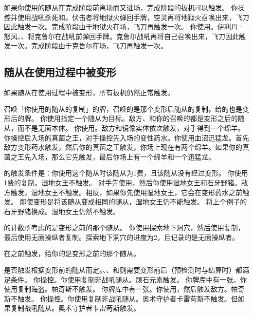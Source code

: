 如果你使用的随从在完成阶段前离场而又进场，完成阶段的扳机可以触发。
\example 你操控并使用战吼杀死和。伏击者将地狱火弹回手牌，空灵再将地狱火召唤出来，飞刀因此触发一次。完成阶段由于地狱火在场，飞刀再触发一次。
\example 你使用。伊利丹·怒风、、将克鲁尔在战吼前弹回手牌。克鲁尔战吼再将自己召唤出来，飞刀因此触发一次。完成阶段由于克鲁尔在场，飞刀再触发一次。

\subsection{随从在使用过程中被变形}

如果随从在使用过程中被变形，所有扳机仍然正常触发。

召唤「你使用的随从的复制」的牌，召唤的是那个变形后随从的复制。给的也是变形后的牌。
\example 你使用指定一个随从为目标。敌方、和你的召唤的都是变形之后的随从，而不是无面本体。
\example 你使用。敌方和镜像实体依次触发，对手得到一个绵羊。
\example 你操控后入场的真菌之王，对手操控先入场的变性药水。你使用血沼迅猛龙。首先敌方变形药水触发，然后你的真菌之王触发，你场上现在有两个绵羊。如果你的真菌之王先入场，那么它先触发，最后你场上有一个绵羊和一个迅猛龙。

的触发条件是：你使用这个随从时该随从为1费，且该随从没有经过变形。
\example 你使用1费的复制。湿地女王不触发。
\example 对手先使用，然后你使用湿地女王和石牙野猪。敌方触发，湿地女王不触发。相反，如果你先使用湿地女王，它会在变形药水之前触发。
\notice 即使变形是将该随从变成相同的随从，湿地女王仍不能触发。
\example 将上个例子的石牙野猪换成。湿地女王仍然不触发。

的计数所考虑的是变形之前的那个随从。
\example 你使用探索地下洞穴，然后使用复制，最后使用无面操纵者复制。探索地下洞穴的进度为2，且记录的是无面操纵者。

在之前触发，给你的是变形之前的那个随从。

是否触发根据变形前的随从而定。、、和则需要变形前后（预检测时与结算时）都满足条件。
\example 你操控。你使用复制非战吼随从。顽石元素触发。
\example 你牌库中有一张。你使用复制海盗。帕奇斯不触发。
\example 你牌库中有一张。你使用，然后触发敌方。帕奇斯不触发。
\example 你操控。你使用复制非战吼随从。奥术守护者卡雷苟斯不触发。但如果复制战吼随从。奥术守护者卡雷苟斯触发。

